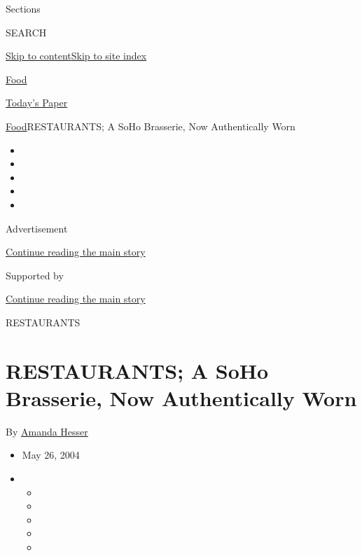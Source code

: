Sections

SEARCH

\protect\hyperlink{site-content}{Skip to
content}\protect\hyperlink{site-index}{Skip to site index}

\href{https://www.nytimes3xbfgragh.onion/section/food}{Food}

\href{https://myaccount.nytimes3xbfgragh.onion/auth/login?response_type=cookie\&client_id=vi}{}

\href{https://www.nytimes3xbfgragh.onion/section/todayspaper}{Today's
Paper}

\href{/section/food}{Food}\textbar{}RESTAURANTS; A SoHo Brasserie, Now
Authentically Worn

\begin{itemize}
\item
\item
\item
\item
\item
\end{itemize}

Advertisement

\protect\hyperlink{after-top}{Continue reading the main story}

Supported by

\protect\hyperlink{after-sponsor}{Continue reading the main story}

RESTAURANTS

\hypertarget{restaurants-a-soho-brasserie-now-authentically-worn}{%
\section{RESTAURANTS; A SoHo Brasserie, Now Authentically
Worn}\label{restaurants-a-soho-brasserie-now-authentically-worn}}

By \href{https://www.nytimes3xbfgragh.onion/by/amanda-hesser}{Amanda
Hesser}

\begin{itemize}
\item
  May 26, 2004
\item
  \begin{itemize}
  \item
  \item
  \item
  \item
  \item
  \end{itemize}
\end{itemize}

